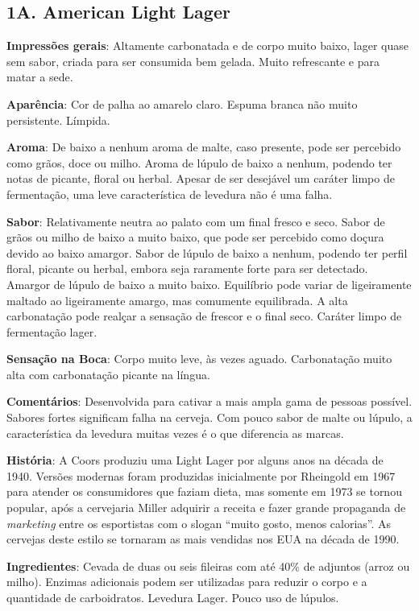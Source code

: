 \subsection*{1A. American Light Lager}

\textbf{Impressões gerais}: Altamente carbonatada e de corpo muito
baixo, lager quase sem sabor, criada para ser consumida bem gelada.
Muito refrescante e para matar a sede.

\textbf{Aparência}: Cor de palha ao amarelo claro. Espuma branca não
muito persistente. Límpida.

\textbf{Aroma}: De baixo a nenhum aroma de malte, caso presente, pode
ser percebido como grãos, doce ou milho. Aroma de lúpulo de baixo a
nenhum, podendo ter notas de picante, floral ou herbal. Apesar de ser
desejável um caráter limpo de fermentação, uma leve característica de
levedura não é uma falha.

\textbf{Sabor}: Relativamente neutra ao palato com um final fresco e
seco. Sabor de grãos ou milho de baixo a muito baixo, que pode ser
percebido como doçura devido ao baixo amargor. Sabor de lúpulo de baixo
a nenhum, podendo ter perfil floral, picante ou herbal, embora seja
raramente forte para ser detectado. Amargor de lúpulo de baixo a muito
baixo. Equilíbrio pode variar de ligeiramente maltado ao ligeiramente
amargo, mas comumente equilibrada. A alta carbonatação pode realçar a
sensação de frescor e o final seco. Caráter limpo de fermentação lager.

\textbf{Sensação na Boca}: Corpo muito leve, às vezes aguado.
Carbonatação muito alta com carbonatação picante na língua.

\textbf{Comentários}: Desenvolvida para cativar a mais ampla gama de
pessoas possível. Sabores fortes significam falha na cerveja. Com pouco
sabor de malte ou lúpulo, a característica da levedura muitas vezes é o
que diferencia as marcas.

\textbf{História}: A Coors produziu uma Light Lager por alguns anos na
década de 1940. Versões modernas foram produzidas inicialmente por
Rheingold em 1967 para atender os consumidores que faziam dieta, mas
somente em 1973 se tornou popular, após a cervejaria Miller adquirir a
receita e fazer grande propaganda de \emph{marketing} entre os
esportistas com o slogan ``muito gosto, menos calorias''. As cervejas
deste estilo se tornaram as mais vendidas nos EUA na década de 1990.

\textbf{Ingredientes}: Cevada de duas ou seis fileiras com até 40\% de
adjuntos (arroz ou milho). Enzimas adicionais podem ser utilizadas para
reduzir o corpo e a quantidade de carboidratos. Levedura Lager. Pouco
uso de lúpulos.

